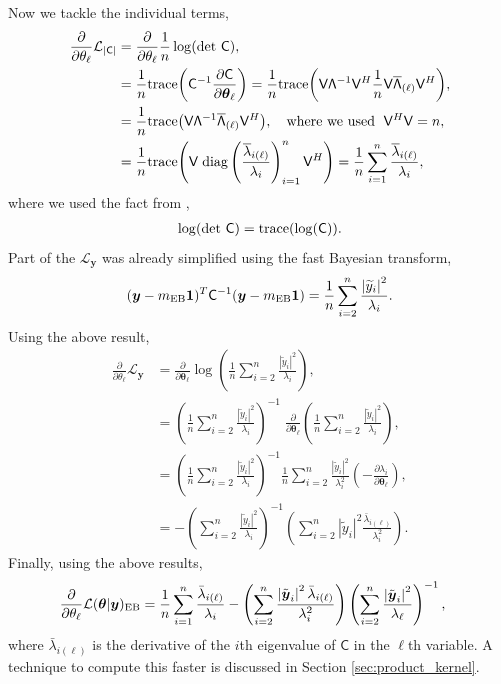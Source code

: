 \documentclass{iitthesis}          %
\newcommand{\bm}[1]{\boldsymbol{#1}}
\newcommand{\trace}[1]{\textup{trace}{#1}}
\newcommand{\vtheta}{{\bm{\theta}}}
\newcommand{\vy}{\bm{y}}
\newcommand{\tvy}{\tilde{\bm{y}}}
\newcommand{\vone}{\bm{1}}
\newcommand{\mC}{\mathsf{C}}
\newcommand{\mCInv}{{\mathsf{C}^{-1}}}
\newcommand{\mLambda}{\mathsf{\Lambda}}
\newcommand{\mV}{\mathsf{V}}
\newcommand{\MLE}{\textup{EB}}
\newcommand{\diag}{\text{diag}}
\def\abs#1{\ensuremath{\left \lvert #1 \right \rvert}}
\begin{document}
Now we tackle the individual terms,
\begin{align*}
\frac{\partial}{\partial \theta_\ell} \mathcal{L}_{\abs{\mC}} &= \frac{\partial}{\partial \theta_\ell}  \frac{1}{n} \log(\det\, \mC) ,
\\ & = \frac 1n \trace{\left( \mCInv \frac{\partial \mC}{\partial \vtheta_\ell} \right)}
= \frac{1}{n}
\trace{\left( \mV {\mLambda}^{-1} \mV^H
	\frac 1n \mV \overline{\mLambda}_{(\ell)} \mV^H
	\right)},
\\
& = \frac{1}{n}
\trace{\left(
	\mV {\mLambda}^{-1}  \overline{\mLambda}_{(\ell)} \mV^H
	\right)}, \quad \text{where we used } \; \mV^H \mV = n,
\\
& =\frac{1}{n}
\trace{\left(
	\mV \;
	\diag\left( \frac{\overline{\lambda}_{i(\ell)}}{\lambda_i} \right)_{i=1}^n \mV^H
	\right)}
= \frac{1}{n} \sum_{i=1}^{n} \frac{\overline{\lambda}_{i(\ell)}}{\lambda_i},
\end{align*}
where we used the fact from \cite{Hig08},
\begin{align*}
\log(\det\, \mC)  = \trace{ (\log( \mC)) }.
\end{align*}
Part of the $\mathcal{L}_{\vy}$ was already simplified using the fast Bayesian transform,
\begin{align*}
{(\vy-m_\MLE\vone)^T\mCInv(\vy-m_\MLE\vone)} = \frac{1}{n} \sum_{i=2}^n \frac{\abs{\widetilde{y}_i}^2}{\lambda_i}.
\end{align*}
Using the above result,
\begin{align*}
\frac{\partial}{\partial \theta_\ell} \mathcal{L}_{\vy} 
&= \frac{\partial}{\partial \vtheta_\ell} \log\left(\frac{1}{n} \sum_{i=2}^n \frac{\abs{\widetilde{y}_i}^2}{\lambda_i} \right) ,
\\ 
&= \left(\frac{1}{n} \sum_{i=2}^n \frac{\abs{\widetilde{y}_i}^2}{\lambda_i}\right)^{-1}
\;
\frac{\partial}{\partial \vtheta_\ell} \left(\frac{1}{n} \sum_{i=2}^n \frac{\abs{\widetilde{y}_i}^2}{\lambda_i} \right) ,
\\ &= \left(
\frac{1}{n} \sum_{i=2}^n \frac{\abs{\widetilde{y}_i}^2}{\lambda_i} \right)^{-1} \frac{1}{n} \sum_{i=2}^n \frac{\abs{\widetilde{y}_i}^2}{\lambda_i^2}
\left( -\frac{\partial \lambda_i}{\partial \vtheta_\ell} \right),
\\ &= -\left(
\sum_{i=2}^n \frac{\abs{\widetilde{y}_i}^2}{\lambda_i} \right)^{-1} 
\left( \sum_{i=2}^n \abs{\widetilde{y}_i}^2 \frac{ \bar{ \lambda}_{i(\ell)} }{\lambda_i^2}
\right).
\end{align*}
Finally, using the above results,
\begin{align}
\label{eqn:deriv_obj_func_MLE}
\frac{\partial}{\partial \theta_\ell} \mathcal{L}(\vtheta | \vy)_{\MLE}
&=  \frac 1n \sum_{i=1}^{n} \frac{\bar{\lambda}_{i(\ell)}}{\lambda_i}
- \left({ \sum_{i=2}^n \frac{\abs{\tvy_i}^2 \bar{\lambda}_{i(\ell)}}{\lambda_i^2}}\right)
\left( {\sum_{i=2}^n \frac{\abs{\tvy_i}^2}{\lambda_\ell}} \right)^{-1},
\end{align}
where $\bar{\lambda}_{i(\ell)}$ is the derivative of the $i$th eigenvalue of $\mC$ in the $\ell$th variable. A technique to compute this faster is discussed in Section \ref{sec:product_kernel}. 
\end{document}
